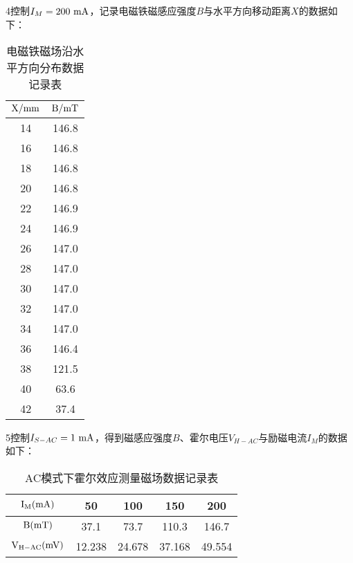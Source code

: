 \documentclass[11pt]{article}
\begin{document}
{\large\textcircled{\small{4}}}控制$I_M=200\,\,{\rm mA}$，记录电磁铁磁感应强度$B$与水平方向移动距离$X$的数据如下：
\begin{table}[H]
    \centering
    \caption{电磁铁磁场沿水平方向分布数据记录表}
    \begin{tabular}{cc}
        \toprule
        $\rm X/mm$ & $\rm B/mT$ \\ 
        \midrule
        14 & 146.8  \\ 
        16 & 146.8  \\ 
        18 & 146.8  \\ 
        20 & 146.8  \\ 
        22 & 146.9  \\ 
        24 & 146.9  \\ 
        26 & 147.0  \\ 
        28 & 147.0  \\ 
        30 & 147.0  \\ 
        32 & 147.0  \\ 
        34 & 147.0  \\ 
        36 & 146.4  \\ 
        38 & 121.5  \\ 
        40 & 63.6  \\ 
        42 & 37.4 \\ 
        \bottomrule
    \end{tabular}
\end{table}


{\large\textcircled{\small{5}}}控制$I_{S-AC}=1\,\,{\rm mA}$，得到磁感应强度$B$、霍尔电压$V_{H-AC}$与励磁电流$I_M$的数据如下：
\begin{table}[H]
    \centering
    \caption{AC模式下霍尔效应测量磁场数据记录表}
    \begin{tabular}{ccccc}
        \toprule
        $\rm I_M(mA)$ & 50 & 100 & 150 & 200 \\ 
        \midrule
        $\rm B(mT)$ & 37.1 & 73.7 & 110.3 & 146.7 \\ 
        $\rm V_{H-AC}(mV)$& 12.238 & 24.678 & 37.168 & 49.554 \\ 
        \bottomrule
    \end{tabular}
\end{table}
\end{document}
